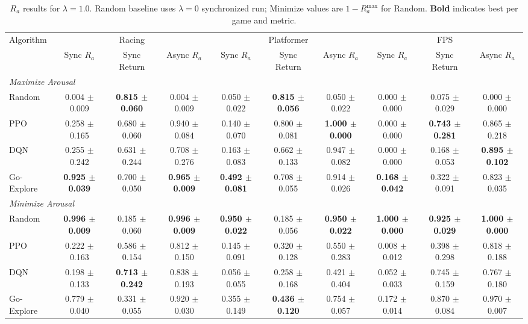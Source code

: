 \begin{table}[ht]
\centering
\caption{$R_a$ results for $\lambda=1.0$. Random baseline uses $\lambda=0$ synchronized run; Minimize values are $1 - R_a^{\text{max}}$ for Random. \textbf{Bold} indicates best per game and metric.}
\label{tab:ra_lambda1}
\begin{tabular}{lccccccccc}
\toprule
Algorithm & \multicolumn{3}{c}{Racing} & \multicolumn{3}{c}{Platformer} & \multicolumn{3}{c}{FPS} \\
\cmidrule(lr){2-4} \cmidrule(lr){5-7} \cmidrule(lr){8-10}
 & Sync $R_a$ & Sync Return & Async $R_a$ & Sync $R_a$ & Sync Return & Async $R_a$ & Sync $R_a$ & Sync Return & Async $R_a$ \\
\midrule
\multicolumn{10}{l}{\textit{Maximize Arousal}} \\
\midrule
Random & 0.004 $\pm$ 0.009 & \textbf{0.815 $\pm$ 0.060} & 0.004 $\pm$ 0.009 & 0.050 $\pm$ 0.022 & \textbf{0.815 $\pm$ 0.056} & 0.050 $\pm$ 0.022 & 0.000 $\pm$ 0.000 & 0.075 $\pm$ 0.029 & 0.000 $\pm$ 0.000 \\
PPO & 0.258 $\pm$ 0.165 & 0.680 $\pm$ 0.060 & 0.940 $\pm$ 0.084 & 0.140 $\pm$ 0.070 & 0.800 $\pm$ 0.081 & \textbf{1.000 $\pm$ 0.000} & 0.000 $\pm$ 0.000 & \textbf{0.743 $\pm$ 0.281} & 0.865 $\pm$ 0.218 \\
DQN & 0.255 $\pm$ 0.242 & 0.631 $\pm$ 0.244 & 0.708 $\pm$ 0.276 & 0.163 $\pm$ 0.083 & 0.662 $\pm$ 0.133 & 0.947 $\pm$ 0.082 & 0.000 $\pm$ 0.000 & 0.168 $\pm$ 0.053 & \textbf{0.895 $\pm$ 0.102} \\
Go-Explore & \textbf{0.925 $\pm$ 0.039} & 0.700 $\pm$ 0.050 & \textbf{0.965 $\pm$ 0.009} & \textbf{0.492 $\pm$ 0.081} & 0.708 $\pm$ 0.055 & 0.914 $\pm$ 0.026 & \textbf{0.168 $\pm$ 0.042} & 0.322 $\pm$ 0.091 & 0.823 $\pm$ 0.035 \\
\midrule
\multicolumn{10}{l}{\textit{Minimize Arousal}} \\
\midrule
Random & \textbf{0.996 $\pm$ 0.009} & 0.185 $\pm$ 0.060 & \textbf{0.996 $\pm$ 0.009} & \textbf{0.950 $\pm$ 0.022} & 0.185 $\pm$ 0.056 & \textbf{0.950 $\pm$ 0.022} & \textbf{1.000 $\pm$ 0.000} & \textbf{0.925 $\pm$ 0.029} & \textbf{1.000 $\pm$ 0.000} \\
PPO & 0.222 $\pm$ 0.163 & 0.586 $\pm$ 0.154 & 0.812 $\pm$ 0.150 & 0.145 $\pm$ 0.091 & 0.320 $\pm$ 0.128 & 0.550 $\pm$ 0.283 & 0.008 $\pm$ 0.012 & 0.398 $\pm$ 0.298 & 0.818 $\pm$ 0.188 \\
DQN & 0.198 $\pm$ 0.133 & \textbf{0.713 $\pm$ 0.242} & 0.838 $\pm$ 0.193 & 0.056 $\pm$ 0.055 & 0.258 $\pm$ 0.168 & 0.421 $\pm$ 0.404 & 0.052 $\pm$ 0.033 & 0.745 $\pm$ 0.159 & 0.767 $\pm$ 0.180 \\
Go-Explore & 0.779 $\pm$ 0.040 & 0.331 $\pm$ 0.055 & 0.920 $\pm$ 0.030 & 0.355 $\pm$ 0.149 & \textbf{0.436 $\pm$ 0.120} & 0.754 $\pm$ 0.057 & 0.172 $\pm$ 0.014 & 0.870 $\pm$ 0.084 & 0.970 $\pm$ 0.007 \\
\bottomrule
\end{tabular}
\end{table}
